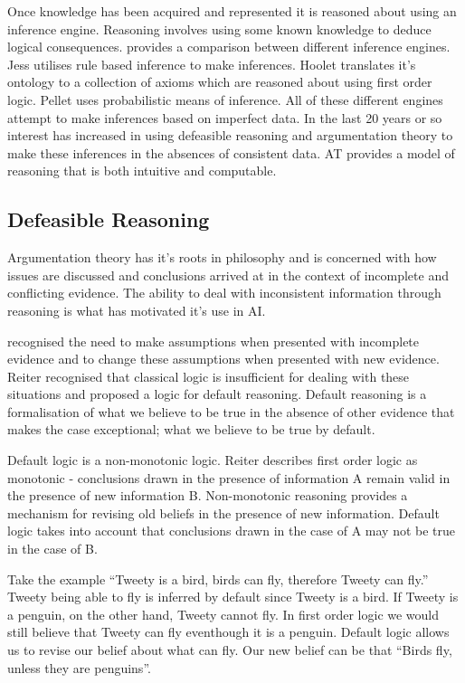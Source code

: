 Once knowledge has been acquired and represented it is reasoned about using an inference engine. Reasoning involves using some known knowledge to deduce logical consequences. \cite{singh2010comparative} provides a comparison between different inference engines. Jess utilises rule based inference to make inferences. Hoolet translates it's ontology to a collection of axioms which are reasoned about using first order logic. Pellet uses probabilistic means of inference. All of these different engines attempt to make inferences based on imperfect data. In the last 20 years or so interest has increased in using defeasible reasoning and argumentation theory to make these inferences in the absences of consistent data. AT provides a model of reasoning that is both intuitive and computable.

\subsection{Defeasible Reasoning}

Argumentation theory has it's roots in philosophy and is concerned with how issues are discussed and conclusions arrived at in the context of incomplete and conflicting evidence. The ability to deal with inconsistent information through reasoning is what has motivated it's use in AI. 

\cite{reiter1980logic} recognised the need to make assumptions when presented with incomplete evidence and to change these assumptions when presented with new evidence. Reiter recognised that classical logic is insufficient for dealing with these situations and proposed a logic for default reasoning. Default reasoning is a formalisation of what we believe to be true in the absence of other evidence that makes the case exceptional; what we believe to be true by default.

Default logic is a non-monotonic logic. Reiter describes first order logic as monotonic - conclusions drawn in the presence of information A remain valid in the presence of new information B. Non-monotonic reasoning provides a mechanism for revising old beliefs in the presence of new information. Default logic takes into account that conclusions drawn in the case of A may not be true in the case of B.

Take the example “Tweety is a bird, birds can fly, therefore Tweety can fly.” Tweety being able to fly is inferred by default since Tweety is a bird. If Tweety is a penguin, on the other hand, Tweety cannot fly. In first order logic we would still believe that Tweety can fly eventhough it is a penguin. Default logic allows us to revise our belief about what can fly. Our new belief can be that ``Birds fly, unless they are penguins''.

